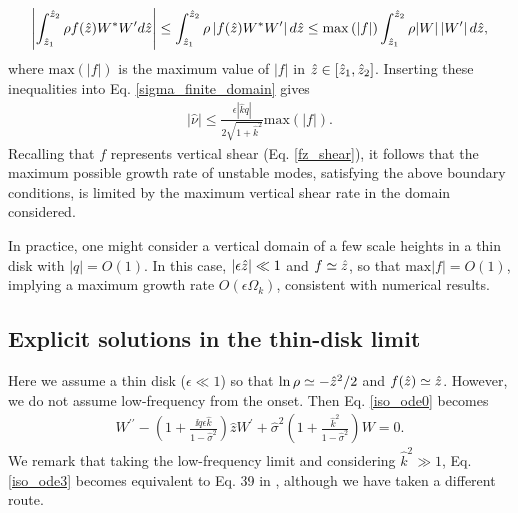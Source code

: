 \begin{align}
  \left|\int_{\hat{z}_1}^{\hat{z}_2}\rho
    f(\hat{z}) W^*W^\prime d\hat{z}\right|\leq \int_{\hat{z}_1}^{\hat{z}_2}\rho
  \left|f(\hat{z})W^*W^\prime \right|d\hat{z}
  \leq
  \mathrm{max}\left(|f|\right)\int_{\hat{z}_1}^{\hat{z}_2}\rho
  |W|\left|W^\prime \right|d\hat{z},
\end{align}
where $\mathrm{max}(|f|)$ is the maximum value of $|f|$ in
$\hat{z}\in[\hat{z}_1,\hat{z}_2]$. Inserting these inequalities into
Eq. \ref{sigma_finite_domain} gives
\begin{align}\label{max_growth}
  |\hat{\nu}|\leq
  \frac{\epsilon |\hat{k} q|}{2\sqrt{1+\hat{k}^2}}\mathrm{max}(|f|). 
\end{align}
Recalling that $f$ represents vertical shear (Eq. \ref{fz_shear}), it
follows that the maximum possible growth rate of unstable modes,
satisfying the above boundary conditions, is limited by the maximum
vertical shear rate in the domain considered.  

In practice, one might consider a vertical domain of a few scale 
heights in a thin disk with $|q|=O(1)$. In this case, $|\epsilon\hat{z}|\ll1$ and  
$f\simeq \hat{z}$, so that $\mathrm{max}|f| = O(1)$, implying a
maximum growth rate $O(\epsilon \Omega_k)$, consistent with numerical
results. 


\subsection{Explicit solutions in the thin-disk limit}\label{iso_explicit}
Here we assume a thin disk ($\epsilon\ll1$) so that $\ln\rho\simeq
-\hat{z}^2/2$ and $f(\hat{z})\simeq \hat{z}$. However, we do not assume 
low-frequency from the onset. Then Eq. \ref{iso_ode0} becomes 
\begin{align}\label{iso_ode3}
  W^{\prime\prime} - \left(1 + \frac{\ii q\epsilon \hat{k}}{1-\hat{\sigma}^2}\right)\hat{z}W^\prime  +
  \hat{\sigma}^2\left(1+\frac{\hat{k}^2}{1-\hat{\sigma}^2}\right)W = 0.
\end{align}
We remark that taking the low-frequency limit and considering
$\hat{k}^2\gg 1$, Eq. \ref{iso_ode3} becomes equivalent to Eq. 39 in
\cite{nelson13}, although we have taken a different route.   
 
